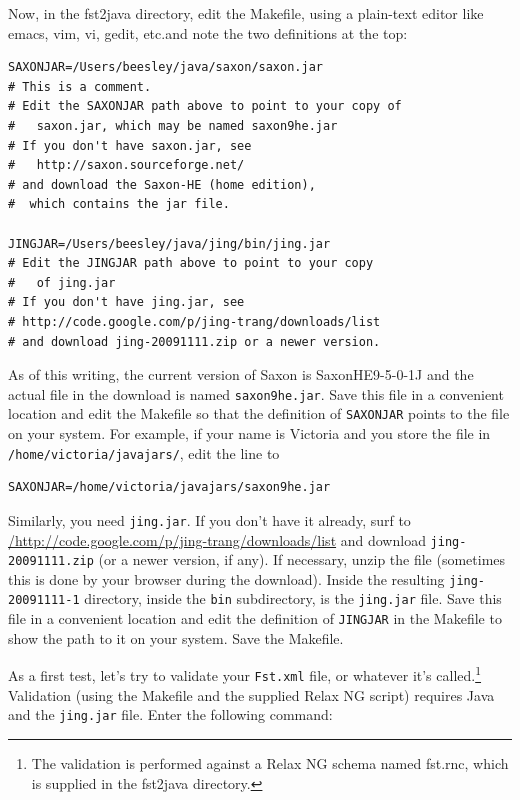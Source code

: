 Now, in the fst2java directory, edit the Makefile, using a plain-text editor like emacs, vim, vi, gedit, etc.\@ and note the two definitions at the top:

\begin{Verbatim}
SAXONJAR=/Users/beesley/java/saxon/saxon.jar
# This is a comment.
# Edit the SAXONJAR path above to point to your copy of 
#   saxon.jar, which may be named saxon9he.jar
# If you don't have saxon.jar, see 
# 	http://saxon.sourceforge.net/
# and download the Saxon-HE (home edition), 
#  which contains the jar file.

JINGJAR=/Users/beesley/java/jing/bin/jing.jar
# Edit the JINGJAR path above to point to your copy 
#	of jing.jar
# If you don't have jing.jar, see 
# http://code.google.com/p/jing-trang/downloads/list
# and download jing-20091111.zip or a newer version.
\end{Verbatim}

\noindent
As of this writing, the current version of Saxon is SaxonHE9-5-0-1J and the actual  file in the download is
named \texttt{saxon9he.jar}.  Save this  file in a convenient location and edit the Makefile so that the definition of
\texttt{SAXONJAR} points to the  file on your system.  For example, if your name is Victoria and you store the  file in
\texttt{/home/victoria/javajars/}, edit the line to

\begin{Verbatim}
SAXONJAR=/home/victoria/javajars/saxon9he.jar
\end{Verbatim}

Similarly, you need \texttt{jing.jar}.  If you don't have it already, surf to \url{/http://code.google.com/p/jing-trang/downloads/list} and
download \texttt{jing-20091111.zip} (or a newer version, if any).  If necessary, unzip the file (sometimes this is done by
your browser during the download).  Inside the resulting \texttt{jing-20091111-1} directory, inside the \texttt{bin}
subdirectory, is the \texttt{jing.jar} file.  Save this file in a
convenient location and edit the definition of \texttt{JINGJAR} in
the Makefile to show the path to it on your system.  Save the Makefile.

As a first test, let's try to validate your \texttt{Fst.xml} file, or whatever it's called.\footnote{The validation is
performed against a Relax NG schema named fst.rnc, which is supplied in the fst2java
directory.}  Validation (using the Makefile and the supplied Relax NG script) requires Java and the
\texttt{jing.jar} file.  Enter the following command:

